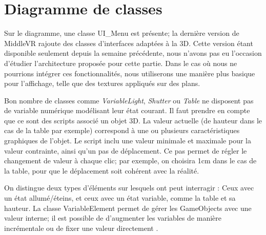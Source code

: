 \section{Diagramme de classes}

Sur le diagramme, une classe UI_Menu est présente; la dernière version de MiddleVR rajoute des classes d'interfaces adaptées à la 3D.
Cette version étant disponible seulement depuis la semaine précédente, nous n'avons pas eu l'occasion d'étudier l'architecture proposée pour cette partie.
Dans le cas où nous ne pourrions intégrer ces fonctionnalités, nous utiliserons une manière plus basique pour l'affichage, telle que des textures appliqués sur des plans.

Bon nombre de classes comme \textit{VariableLight}, \textit{Shutter} ou \textit{Table} ne disposent pas de variable numérique modélisant leur état courant.
Il faut prendre en compte que ce sont des scripts associé un objet 3D. La valeur actuelle (de hauteur dans le cas de la table par exemple) correspond à une ou plusieurs caractéristiques graphiques de l'objet.
Le script inclu une valeur minimale et maximale pour la valeur contrainte, ainsi qu'un pas de déplacement.
Ce pas permet de régler le changement de valeur à chaque clic; par exemple, on choisira 1cm dans le cas de la table, pour que le déplacement soit cohérent avec la réalité.
 
 
 On distingue deux types d'éléments sur lesquels ont peut interragir : Ceux avec un état allumé/éteins, et ceux avec un état variable, comme la table et sa hauteur.
 La classe VariableElement permet de gérer les GameObjects avec une valeur interne; il est possible de d'augmenter les variables de manière incrémentale ou de fixer une valeur directement
 .
 